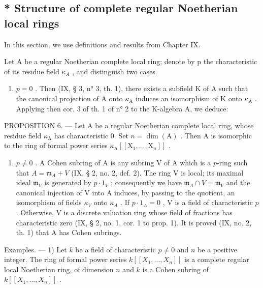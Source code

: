 \subsection{* Structure of complete regular Noetherian local rings}

In this section, we use definitions and results from Chapter IX.

Let A be a regular Noetherian complete local ring; denote by p the characteristic of its residue field \(\kappa_{A}\) , and distinguish two cases.

\begin{enumerate}
\def\labelenumi{\Alph{enumi})}
\tightlist
\item
  \(p = 0\) . Then (IX, § 3, n° 3, th. 1), there exists a subfield K of A such that the canonical projection of A onto \(\kappa_{\mathrm{A}}\) induces an isomorphism of K onto \(\kappa_{\mathrm{A}}\) . Applying then cor. 3 of th. 1 of n° 2 to the K-algebra A, we deduce:
\end{enumerate}

PROPOSITION 6. --- Let A be a regular Noetherian complete local ring, whose residue field \(\kappa_{\mathrm{A}}\) has characteristic 0. Set \(n = \dim(\mathrm{A})\) . Then A is isomorphic to the ring of formal power series \(\kappa_{\mathrm{A}}[[\mathrm{X}_{1}, ..., \mathrm{X}_{n}]]\) .

\begin{enumerate}
\def\labelenumi{\Alph{enumi})}
\setcounter{enumi}{1}
\tightlist
\item
  \(p \neq 0\) . A Cohen subring of A is any subring V of A which is a \(p\)-ring such that \(A = \mathfrak{m}_{A} + V\) (IX, § 2, no. 2, def. 2). The ring V is local; its maximal ideal \(\mathfrak{m}_{V}\) is generated by \(p \cdot 1_{V}\) ; consequently we have \(\mathfrak{m}_{A} \cap V = \mathfrak{m}_{V}\) and the canonical injection of V into A induces, by passing to the quotient, an isomorphism of fields \(\kappa_{V}\) onto \(\kappa_{A}\) . If \(p \cdot 1_{A} = 0\) , V is a field of characteristic \(p\) . Otherwise, V is a discrete valuation ring whose field of fractions has characteristic zero (IX, § 2, no. 1, cor. 1 to prop. 1). It is proved (IX, no. 2, th. 1) that A has Cohen subrings.
\end{enumerate}

Examples. --- 1) Let \(k\) be a field of characteristic \(p \neq 0\) and \(n\) be a positive integer. The ring of formal power series \(k[[X_1, ..., X_n]]\) is a complete regular local Noetherian ring, of dimension \(n\) and \(k\) is a Cohen subring of \(k[[X_1, ..., X_n]]\) .

